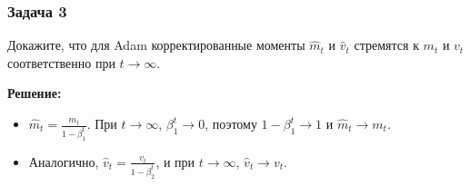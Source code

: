 \subsubsection*{Задача 3}
Докажите, что для Adam корректированные моменты $\hat{m}_t$ и $\hat{v}_t$ стремятся к $m_t$ и $v_t$ соответственно при $t \to \infty$.

\textbf{Решение:}
\begin{itemize}
    \item $\hat{m}_t = \frac{m_t}{1 - \beta_1^t}$. При $t \to \infty$, $\beta_1^t \to 0$, поэтому $1 - \beta_1^t \to 1$ и $\hat{m}_t \to m_t$.
    \item Аналогично, $\hat{v}_t = \frac{v_t}{1 - \beta_2^t}$, и при $t \to \infty$, $\hat{v}_t \to v_t$.
\end{itemize}
